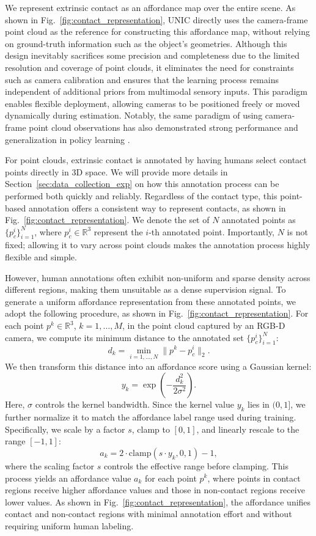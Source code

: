 \documentclass[letterpaper, 10 pt, conference]{ieeeconf}  %
\newcommand{\unic}{\textsc{UNIC}}
\begin{document}
We represent extrinsic contact as an affordance map over the entire scene. As shown in Fig.~\ref{fig:contact_representation}, \unic{} directly uses the camera-frame point cloud as the reference for constructing this affordance map, without relying on ground-truth information such as the object’s geometries. Although this design inevitably sacrifices some precision and completeness due to the limited resolution and coverage of point clouds, it eliminates the need for constraints such as camera calibration and ensures that the learning process remains independent of additional priors from multimodal sensory inputs. This paradigm enables flexible deployment, allowing cameras to be positioned freely or moved dynamically during estimation. Notably, the same paradigm of using camera-frame point cloud observations has also demonstrated strong performance and generalization in policy learning \cite{ze2024generalizable,zhang2025canonical}.


For point clouds, extrinsic contact is annotated by having humans select contact points directly in 3D space. We will provide more details in Section~\ref{sec:data_collection_exp} on how this annotation process can be performed both quickly and reliably. Regardless of the contact type, this point-based annotation offers a consistent way to represent contacts, as shown in Fig.~\ref{fig:contact_representation}. We denote the set of $N$ annotated points as 
$ \{p^i_c\}_{i=1}^N$, where $p_c^i \in \mathbb{R}^3$ represent the $i$-th annotated point. 
Importantly, $N$ is not fixed; allowing it to vary across point clouds makes the annotation process highly flexible and simple. 

However, human annotations often exhibit non-uniform and sparse density across different regions, making them unsuitable as a dense supervision signal. To generate a uniform affordance representation from these annotated points, we adopt the following procedure, as shown in Fig.~\ref{fig:contact_representation}. For each point $p^k \in \mathbb{R}^3$, $k = 1, \dots, M$, in the point cloud captured by an RGB-D camera, we compute its minimum distance to the annotated set $\{p^i_c\}_{i=1}^N$:
$$
    d_k = \min\limits_{i=1,\dots,N} \|p^k - p_c^i\|_2.
$$
We then transform this distance into an affordance score using a Gaussian kernel: 
$$
    y_k = \exp\!\left(-\frac{d_k^2}{2\sigma^2}\right).
$$
Here, $\sigma$ controls the kernel bandwidth. Since the kernel value $y_k$ lies in $(0, 1]$, we further normalize it to match the affordance label range used during training. Specifically, we scale by a factor $s$, clamp to $[0, 1]$, and linearly rescale to the range $[-1,1]$:
$$
    a_k = 2 \cdot \mathrm{clamp}(s \cdot y_k, 0, 1) - 1,
$$
where the scaling factor $s$ controls the effective range before clamping.
This process yields an affordance value $a_k$ for each point $p^k$, where points in contact regions receive higher affordance values and those in non-contact regions receive lower values. As shown in Fig.~\ref{fig:contact_representation}, the affordance unifies contact and non-contact regions with minimal annotation effort and without requiring uniform human labeling.
\end{document}
